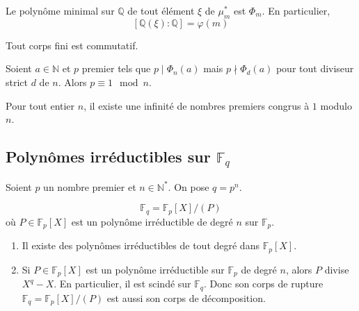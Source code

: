   \begin{corollary}
    Le polynôme minimal sur $\mathbb{Q}$ de tout élément $\xi$ de $\mu_m^*$ est $\Phi_m$. En particulier,
    \[ [\mathbb{Q}(\xi):\mathbb{Q}]=\varphi(m) \]
  \end{corollary}

  \begin{application}
    Tout corps fini est commutatif.
  \end{application}


  \begin{lemma}
    Soient $a \in \mathbb{N}$ et $p$ premier tels que $p \mid \Phi_n(a)$ mais $p \nmid \Phi_d(a)$ pour tout diviseur strict $d$ de $n$. Alors $p \equiv 1 \mod n$.
  \end{lemma}


  \begin{application}
    Pour tout entier $n$, il existe une infinité de nombres premiers congrus à $1$ modulo $n$.
  \end{application}

  \subsection{Polynômes irréductibles sur \texorpdfstring{$\mathbb{F}_q$}{Fq}}


  Soient $p$ un nombre premier et $n \in \mathbb{N}^*$. On pose $q = p^n$.

  \begin{theorem}
    \[ \mathbb{F}_q = \mathbb{F}_p[X] / (P) \]
    où $P \in \mathbb{F}_p[X]$ est un polynôme irréductible de degré $n$ sur $\mathbb{F}_p$.
  \end{theorem}

  \begin{corollary}
    \begin{enumerate}[label=(\roman*)]
      \item Il existe des polynômes irréductibles de tout degré dans $\mathbb{F}_p[X]$.
      \item Si $P \in \mathbb{F}_p[X]$ est un polynôme irréductible sur $\mathbb{F}_p$ de degré $n$, alors $P$ divise $X^q - X$. En particulier, il est scindé sur $\mathbb{F}_q$. Donc son corps de rupture $\mathbb{F}_q = \mathbb{F}_p[X] / (P)$ est aussi son corps de décomposition.
    \end{enumerate}
  \end{corollary}

